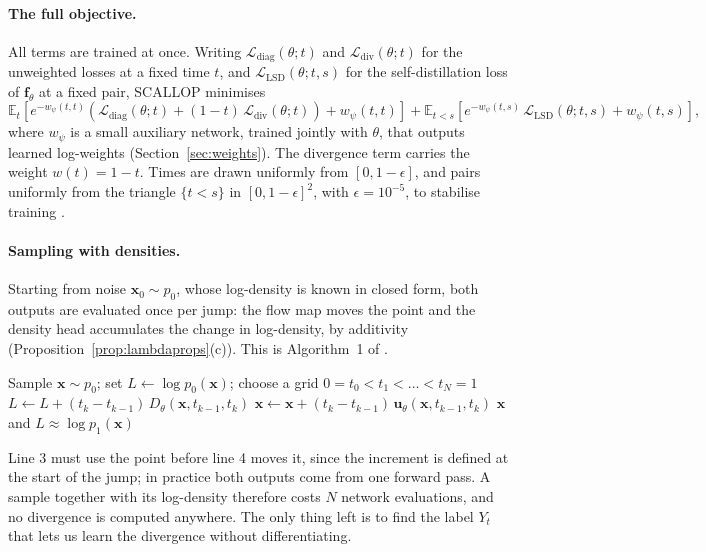\documentclass[11pt,a4paper]{article}
\numberwithin{equation}{section}     %
\theoremstyle{plain}        %
\theoremstyle{definition}   %
\theoremstyle{remark}       %
\begin{document}
\paragraph{The full objective.} All terms are trained at once. Writing $\mathcal{L}_{\mathrm{diag}}(\theta;t)$ and $\mathcal{L}_{\mathrm{div}}(\theta;t)$ for the unweighted losses at a fixed time $t$, and $\mathcal{L}_{\mathrm{LSD}}(\theta;t,s)$ for the self-distillation loss of $\mathbf{f}_\theta$ at a fixed pair, SCALLOP minimises \citep[Eq.~24]{ouyang2026}
\[
\mathbb{E}_{t}\left[e^{-w_\psi(t,t)}\left(\mathcal{L}_{\mathrm{diag}}(\theta;t)+(1-t)\,\mathcal{L}_{\mathrm{div}}(\theta;t)\right)+w_\psi(t,t)\right]+\mathbb{E}_{t<s}\left[e^{-w_\psi(t,s)}\,\mathcal{L}_{\mathrm{LSD}}(\theta;t,s)+w_\psi(t,s)\right],
\]
where $w_\psi$ is a small auxiliary network, trained jointly with $\theta$, that outputs learned log-weights (Section~\ref{sec:weights}). The divergence term carries the weight $w(t)=1-t$. Times are drawn uniformly from $[0,1-\epsilon]$, and pairs uniformly from the triangle $\{t<s\}$ in $[0,1-\epsilon]^2$, with $\epsilon=10^{-5}$, to stabilise training \citep{ouyang2026}.

\paragraph{Sampling with densities.} Starting from noise $\mathbf{x}_0\sim p_0$, whose log-density is known in closed form, both outputs are evaluated once per jump: the flow map moves the point and the density head accumulates the change in log-density, by additivity (Proposition~\ref{prop:lambdaprops}(c)). This is Algorithm~1 of \citet{ouyang2026}.

\begin{algorithm}[htbp]
\caption{Sampling with densities from a neural flow map with a density head}\label{alg:flowdensity}
\begin{algorithmic}[1]
\State Sample $\mathbf{x}\sim p_0$; set $L\gets\log p_0(\mathbf{x})$; choose a grid $0=t_0<t_1<\dots<t_N=1$
\State $L\gets L+(t_k-t_{k-1})\,D_\theta(\mathbf{x},t_{k-1},t_k)$ 
\State $\mathbf{x}\gets\mathbf{x}+(t_k-t_{k-1})\,\mathbf{u}_\theta(\mathbf{x},t_{k-1},t_k)$ 
\EndFor
\State \Return $\mathbf{x}$ and $L\approx\log p_1(\mathbf{x})$
\end{algorithmic}
\end{algorithm}

Line 3 must use the point before line 4 moves it, since the increment is defined at the start of the jump; in practice both outputs come from one forward pass. A sample together with its log-density therefore costs $N$ network evaluations, and no divergence is computed anywhere. The only thing left is to find the label $Y_t$ that lets us learn the divergence without differentiating.
\end{document}
